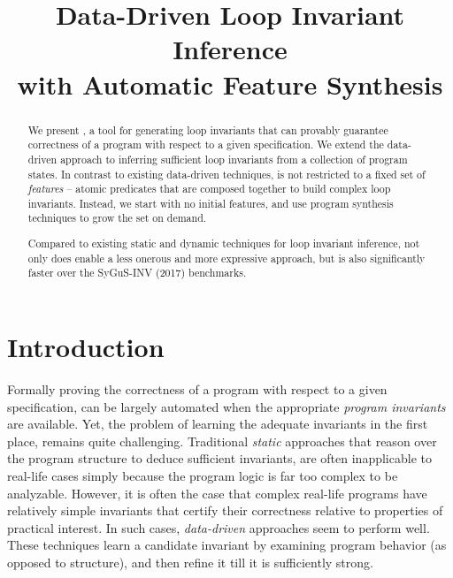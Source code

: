 \documentclass[conference]{IEEEtran}
\begin{document}
\title{Data-Driven Loop Invariant Inference \\ with Automatic Feature Synthesis}

\author{
\and
{}
}




\maketitle

\begin{abstract}
We present \LoopInvGen, a tool for generating loop invariants that can provably guarantee correctness of a program
with respect to a given specification.
We extend the data-driven approach to inferring sufficient loop invariants from a collection of program states.
In contrast to existing data-driven techniques, \LoopInvGen is not restricted to a fixed set of \emph{features} --
atomic predicates that are composed together to build complex loop invariants.
Instead, we start with no initial features, and use program synthesis techniques to grow the set on demand.

Compared to existing static and dynamic techniques for loop invariant inference,
not only does \LoopInvGen enable a less onerous and more expressive approach,
but is also significantly faster over the SyGuS-INV (2017) benchmarks.
\end{abstract}




\section{Introduction} \label{subsec:Introduction}

\noindent
Formally proving the correctness of a program with respect to a given specification,
can be largely automated when the appropriate \emph{program invariants} are available.
Yet, the problem of learning the adequate invariants in the first place, remains quite challenging.
Traditional \emph{static} approaches that reason over the program structure to deduce sufficient invariants,
are often inapplicable to real-life cases simply because the program logic is far too complex to be analyzable.
However, it is often the case that complex real-life programs have relatively simple invariants
that certify their correctness relative to properties of practical interest.
In such cases, \emph{data-driven} approaches seem to perform well.
These techniques learn a candidate invariant by examining program behavior (as opposed to structure),
and then refine it till it is sufficiently strong.
\end{document}

